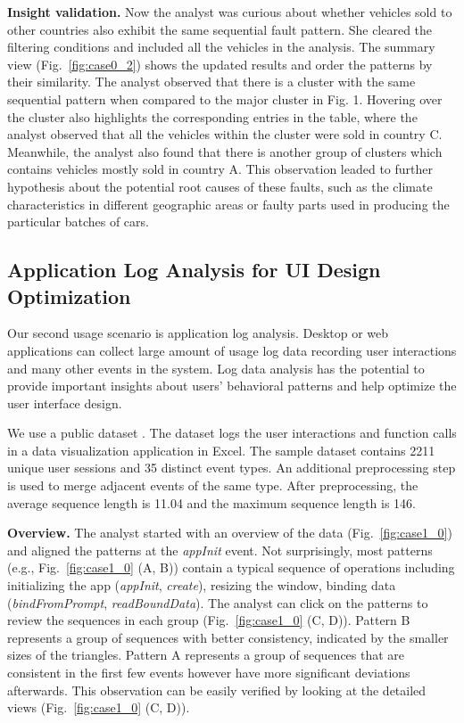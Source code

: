 \textbf{Insight validation.} Now the analyst was curious about whether vehicles sold to other countries also exhibit the same sequential fault pattern. She cleared the filtering conditions and included all the vehicles in the analysis. The summary view (Fig.~\ref{fig:case0_2}) shows the updated results and order the patterns by their similarity. The analyst observed that there is a cluster with the same sequential pattern when compared to the major cluster in Fig. 1. Hovering over the cluster also highlights the corresponding entries in the table, where the analyst observed that all the vehicles within the cluster were sold in country C. Meanwhile, the analyst also found that there is another group of clusters which contains vehicles mostly sold in country A. This observation leaded to further hypothesis about the potential root causes of these faults, such as the climate characteristics in different geographic areas or faulty parts used in producing the particular batches of cars.

\subsection{Application Log Analysis for UI Design Optimization}

Our second usage scenario is application log analysis. Desktop or web applications can collect large amount of usage log data recording user interactions and many other events in the system. Log data analysis has the potential to provide important insights about users' behavioral patterns and help optimize the user interface design. 

We use a public dataset  \cite{agavue}. The dataset logs the user interactions and function calls in a data visualization application in Excel. The sample dataset contains 2211 unique user sessions and 35 distinct event types. An additional preprocessing step is used to merge adjacent events of the same type. After preprocessing, the average sequence length is 11.04 and the maximum sequence length is 146.

\textbf{Overview.} The analyst started with an overview of the data (Fig.~\ref{fig:case1_0}) and aligned the patterns at the \textit{appInit} event. Not surprisingly, most patterns (e.g., Fig.~\ref{fig:case1_0} (A, B)) contain a typical sequence of operations including initializing the app (\textit{appInit}, \textit{create}), resizing the window, binding data (\textit{bindFromPrompt}, \textit{readBoundData}). The analyst can click on the patterns to review the sequences in each group (Fig.~\ref{fig:case1_0} (C, D)). Pattern B represents a group of sequences with better consistency, indicated by the smaller sizes of the triangles. Pattern A represents a group of sequences that are consistent in the first few events however have more significant deviations afterwards. This observation can be easily verified by looking at the detailed views (Fig.~\ref{fig:case1_0} (C, D)).

